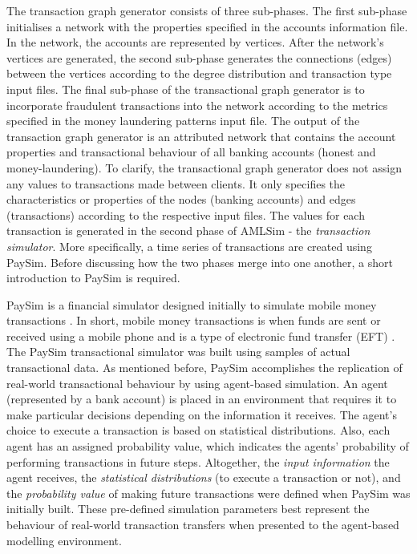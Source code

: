 The transaction graph generator consists of three sub-phases. The first sub-phase initialises a network with the properties specified in the accounts information file. In the network, the accounts are represented by vertices. After the network's vertices are generated, the second sub-phase generates the connections (edges) between the vertices according to the degree distribution and transaction type input files. The final sub-phase of the transactional graph generator is to incorporate fraudulent transactions into the network according to the metrics specified in the money laundering patterns input file. The output of the transaction graph generator is an attributed network that contains the account properties and transactional behaviour of all banking accounts (honest and money-laundering). To clarify, the transactional graph generator does not assign any values to transactions made between clients. It only specifies the characteristics or properties of the nodes (banking accounts) and edges (transactions) according to the respective input files. The values for each transaction is generated in the second phase of AMLSim - the \textit{transaction simulator}. More specifically, a time series of transactions are created using PaySim. Before discussing how the two phases merge into one another, a short introduction to PaySim is required.

PaySim is a financial simulator designed initially to simulate mobile money transactions \citep{lopez2016applying}. In short, mobile money transactions is when funds are sent or received using a mobile phone and is a type of electronic fund transfer (EFT) \citep*{money2021transfer}. The PaySim transactional simulator was built using samples of actual transactional data. As mentioned before, PaySim accomplishes the replication of real-world transactional behaviour by using agent-based simulation. An agent (represented by a bank account) is placed in an environment that requires it to make particular decisions depending on the information it receives. The agent's choice to execute a transaction is based on statistical distributions. Also, each agent has an assigned probability value, which indicates the agents' probability of performing transactions in future steps. Altogether, the \textit{input information} the agent receives, the \textit{statistical distributions} (to execute a transaction or not), and the \textit{probability value} of making future transactions were defined when PaySim was initially built. These pre-defined simulation parameters best represent the behaviour of real-world transaction transfers when presented to the agent-based modelling environment. 

